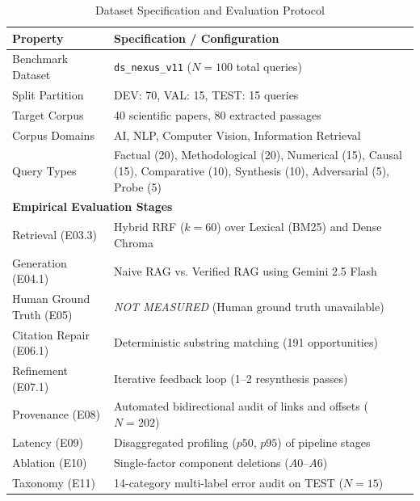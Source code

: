 
\usepackage{booktabs}
\usepackage{tabularx}
\usepackage{multirow}
\usepackage{amsmath}

\begin{table}[t]
\caption{Dataset Specification and Evaluation Protocol}
\label{tab:dataset_protocol}
\centering
\small
\begin{tabularx}{\columnwidth}{lX}
\toprule
\textbf{Property} & \textbf{Specification / Configuration} \\
\midrule
Benchmark Dataset & \texttt{ds\_nexus\_v11} ($N=100$ total queries) \\
Split Partition & DEV: 70, VAL: 15, TEST: 15 queries \\
Target Corpus & 40 scientific papers, 80 extracted passages \\
Corpus Domains & AI, NLP, Computer Vision, Information Retrieval \\
Query Types & Factual (20), Methodological (20), Numerical (15), Causal (15), Comparative (10), Synthesis (10), Adversarial (5), Probe (5) \\
\midrule
\multicolumn{2}{l}{\textbf{Empirical Evaluation Stages}} \\
Retrieval (E03.3) & Hybrid RRF ($k=60$) over Lexical (BM25) and Dense Chroma \\
Generation (E04.1) & Naive RAG vs. Verified RAG using Gemini 2.5 Flash \\
Human Ground Truth (E05) & \textit{NOT MEASURED} (Human ground truth unavailable) \\
Citation Repair (E06.1) & Deterministic substring matching (191 opportunities) \\
Refinement (E07.1) & Iterative feedback loop (1--2 resynthesis passes) \\
Provenance (E08) & Automated bidirectional audit of links and offsets ($N=202$) \\
Latency (E09) & Disaggregated profiling ($p50$, $p95$) of pipeline stages \\
Ablation (E10) & Single-factor component deletions ($A0$--$A6$) \\
Taxonomy (E11) & 14-category multi-label error audit on TEST ($N=15$) \\
\bottomrule
\end{tabularx}
\end{table}

